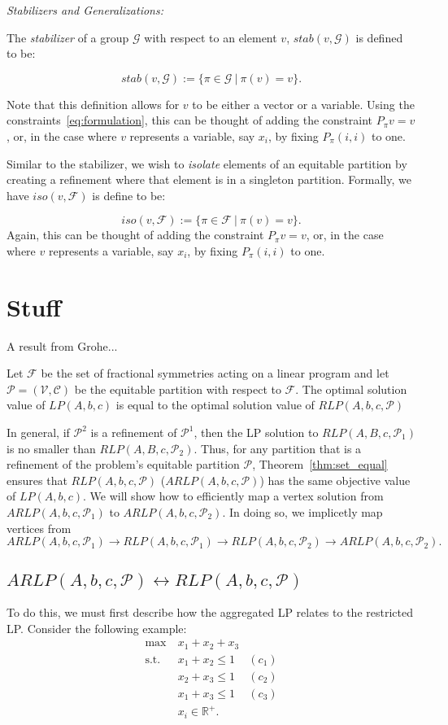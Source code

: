 \documentclass[runningheads]{llncs}
\newcommand{\cP}{{\mathcal P}}
\newcommand{\cF}{{\mathcal F}}
\newcommand{\cG}{{\mathcal G}}
\newcommand{\cC}{{\mathcal C}}
\newcommand{\cV}{{\mathcal V}}
\begin{document}
{\em Stabilizers and Generalizations:}

The {\em stabilizer} of a group $\cG$ with respect to an element $v$, $stab(v,\cG)$ is defined to be:

$$stab(v,\cG) := \{ \pi \in \cG\ | \ \pi(v) = v\}.$$ 

\noindent Note that this definition allows for  $v$ to be either a vector or a variable. Using the constraints~\eqref{eq:formulation}, this can be thought of adding the constraint $P_\pi v = v$, or, in the case where $v$ represents a variable, say $x_i$, by fixing $P_\pi(i,i)$ to one. 

Similar to the stabilizer, we wish to {\em isolate} elements of an equitable partition by creating a refinement where that element is in a singleton partition. Formally, we have $iso(v, \cF)$ is define to be:


$$iso(v,\cF) := \{ \pi \in \cF\ | \ \pi(v) = v\}.$$ 
\noindent Again, this can be thought of adding the constraint $P_\pi v = v$, or, in the case where $v$ represents a variable, say $x_i$, by fixing $P_\pi(i,i)$ to one. 



\section{Stuff}

A result from Grohe...
\begin{theorem} \label{thm:set_equal}
	Let $\cF$ be the set of fractional symmetries acting on a linear program and let $\cP = (\cV, \cC)$ be the
	equitable partition with respect to $\cF$. The optimal solution
	value of $LP(A,b,c)$ is equal to the optimal solution value of $RLP(A,b,c, \cP)$
\end{theorem}




In general, if $\cP^2$ is a refinement of $\cP^1$, then the LP solution
to $RLP(A,B,c,\cP_1)$ is no smaller than $RLP(A,B,c,\cP_2)$. Thus, for any
partition that is a refinement of the problem's equitable partition $\cP$,
Theorem~\ref{thm:set_equal} ensures that $RLP(A,b,c,\cP)$ ($ARLP(A,b,c,\cP)$) has the same
objective value of $LP(A,b,c)$. We will show how to efficiently map a vertex solution from $ARLP(A,b,c,\cP_1)$ to $ARLP(A,b,c,\cP_2)$. In doing so, we implicetly map vertices from $$ARLP(A,b,c,\cP_1) \rightarrow RLP(A,b,c,\cP_1) \rightarrow RLP(A,b,c,\cP_2) \rightarrow ARLP(A,b,c,\cP_2).$$


\subsection{$ARLP(A,b,c,\cP) \leftrightarrow RLP(A,b,c,\cP) $}
To do this, we must first describe how the aggregated LP relates to the restricted LP. Consider the following example:
\begin{align}
\max\ & x_1 + x_2 + x_3\\
\mbox{s.t. } & x_1 + x_2 \leq 1& (c_1)\\
& x_2 + x_3 \leq 1 & (c_2)\\
& x_1 + x_3 \leq 1 & (c_3)\\
& x_i \in \mathbb{R}^+.
\end{align}
\end{document}
